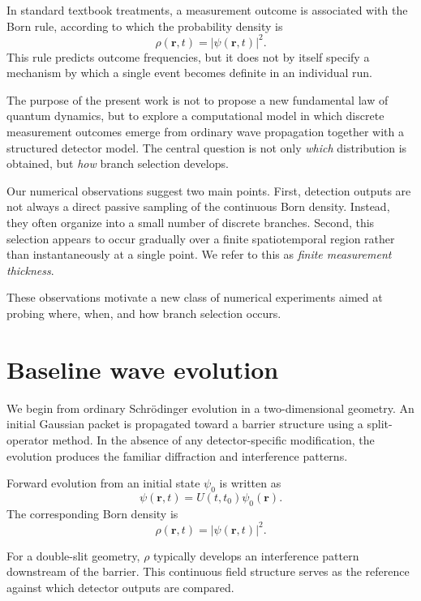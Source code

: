 \documentclass[aps,prl,reprint]{revtex4-2}
\begin{document}
In standard textbook treatments, a measurement outcome is associated with the
Born rule, according to which the probability density is
\begin{equation}
\rho(\mathbf r,t)=|\psi(\mathbf r,t)|^2.
\end{equation}
This rule predicts outcome frequencies, but it does not by itself specify a
mechanism by which a single event becomes definite in an individual run.

The purpose of the present work is not to propose a new fundamental law of
quantum dynamics, but to explore a computational model in which discrete
measurement outcomes emerge from ordinary wave propagation together with a
structured detector model. The central question is not only \emph{which}
distribution is obtained, but \emph{how} branch selection develops.

Our numerical observations suggest two main points. First, detection outputs are
not always a direct passive sampling of the continuous Born density. Instead,
they often organize into a small number of discrete branches. Second, this
selection appears to occur gradually over a finite spatiotemporal region rather
than instantaneously at a single point. We refer to this as \emph{finite
measurement thickness}.

These observations motivate a new class of numerical experiments aimed at
probing where, when, and how branch selection occurs.

\section{Baseline wave evolution}

We begin from ordinary Schr\"odinger evolution in a two-dimensional geometry.
An initial Gaussian packet is propagated toward a barrier structure using a
split-operator method. In the absence of any detector-specific modification,
the evolution produces the familiar diffraction and interference patterns.

Forward evolution from an initial state $\psi_0$ is written as
\begin{equation}
\psi(\mathbf r,t)=U(t,t_0)\psi_0(\mathbf r).
\end{equation}
The corresponding Born density is
\begin{equation}
\rho(\mathbf r,t)=|\psi(\mathbf r,t)|^2.
\end{equation}

For a double-slit geometry, $\rho$ typically develops an interference pattern
downstream of the barrier. This continuous field structure serves as the
reference against which detector outputs are compared.
\end{document}
